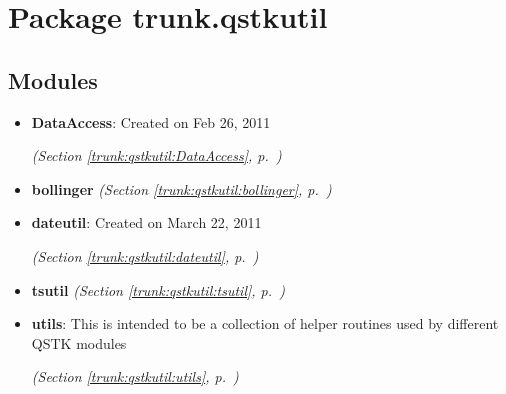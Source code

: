 %
%
%


\section{Package trunk.qstkutil}

    \label{trunk:qstkutil}


\subsection{Modules}

\begin{itemize}
\setlength{\parskip}{0ex}
\item \textbf{DataAccess}: Created on Feb 26, 2011



  \textit{(Section \ref{trunk:qstkutil:DataAccess}, p.~\pageref{trunk:qstkutil:DataAccess})}

\item \textbf{bollinger}
  \textit{(Section \ref{trunk:qstkutil:bollinger}, p.~\pageref{trunk:qstkutil:bollinger})}

\item \textbf{dateutil}: Created on March 22, 2011



  \textit{(Section \ref{trunk:qstkutil:dateutil}, p.~\pageref{trunk:qstkutil:dateutil})}

\item \textbf{tsutil}
  \textit{(Section \ref{trunk:qstkutil:tsutil}, p.~\pageref{trunk:qstkutil:tsutil})}

\item \textbf{utils}: This is intended to be a collection of helper routines used by different 
QSTK modules



  \textit{(Section \ref{trunk:qstkutil:utils}, p.~\pageref{trunk:qstkutil:utils})}

\end{itemize}


